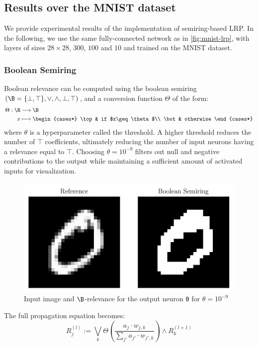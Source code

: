 \documentclass{../cs-classes/cs-classes}
\newcommand*{\1}{\digitsbb{1}}
\newcommand*{\0}{\digitsbb{0}}
\begin{document}
\subsection{Results over the MNIST dataset}
We provide experimental results of the implementation of semiring-based LRP. In the following, we use the same fully-connected network as in \autoref{fig:mnist-lrp}, with layers of sizes $28\times28$, $300$, $100$ and $10$ and trained on the MNIST dataset.
\subsubsection{Boolean Semiring}
Boolean relevance can be computed using the boolean semiring $(\B=\{\bot, \top\}, \lor, \land, \bot, \top)$, and a conversion function $\Theta$ of the form:
\begin{equation}
    \begin{aligned}
        \Theta: \R&\longrightarrow\B\\
        x&\longmapsto \begin{cases*}
            \top & if $x\geq\theta$\\
            \bot & otherwise
        \end{cases*}
    \end{aligned}
\end{equation}
where $\theta$ is a hyperparameter called the threshold. A higher threshold reduces the number of $\top$ coefficients, ultimately reducing the number of input neurons having a relevance equal to $\top$. Choosing $\theta=10^{-9}$ filters out null and negative contributions to the output while maintaining a sufficient amount of activated inputs for visualization.

\begin{figure}[H]
    \centering
    \includegraphics[width=.5\textwidth]{boolean.png}
    \caption{Input image and $\B$-relevance for the output neuron \texttt{0} for $\theta=10^{-9}$}
\end{figure}

The full propagation equation becomes:
\begin{equation}
    R^{(l)}_j := \bigvee_{k}\Theta\left(\frac{a_j\cdot w_{j, k}}{\sum_{j'}a_{j'}\cdot w_{j', k}}\right) \land R^{(l+1)}_k
    \label{eq:boolean-lrp}
\end{equation}
\end{document}
